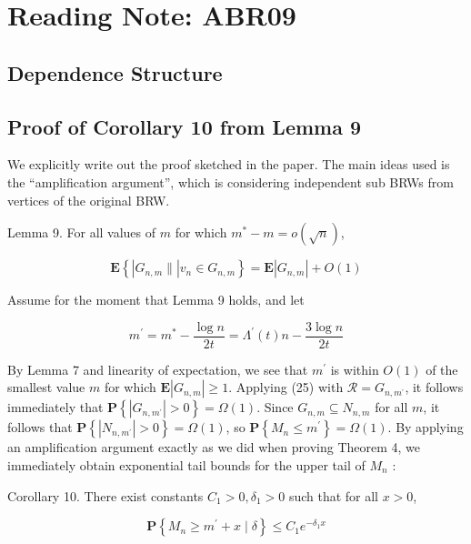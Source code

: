 \section{Reading Note: ABR09}

\subsection{Dependence Structure}

\subsection{Proof of Corollary 10 from Lemma 9}
We explicitly write out the proof sketched in the paper. The main ideas used is the ``amplification argument'', which is considering independent sub BRWs from vertices of the original BRW. 

\begin{tcolorbox}[title=,colback=gray!10,colframe=black,breakable]
    Lemma 9. For all values of $m$ for which $m^*-m=o(\sqrt{n})$,

\[
\mathbf{E}\left\{\left|G_{n, m} \|\right| v_n \in G_{n, m}\right\}=\mathbf{E}\left|G_{n, m}\right|+O(1)
\]


Assume for the moment that Lemma 9 holds, and let

\[
m^{\prime}=m^*-\frac{\log n}{2 t}=\Lambda^{\prime}(t) n-\frac{3 \log n}{2 t}
\]


By Lemma 7 and linearity of expectation, we see that $m^{\prime}$ is within $O(1)$ of the smallest value $m$ for which $\mathbf{E}\left|G_{n, m}\right| \geq 1$. Applying (25) with $\mathcal{R}=G_{n, m^{\prime}}$, it follows immediately that $\mathbf{P}\left\{\left|G_{n, m^{\prime}}\right|>0\right\}=\Omega(1)$. Since $G_{n, m} \subseteq N_{n, m}$ for all $m$, it follows that $\mathbf{P}\left\{\left|N_{n, m^{\prime}}\right|>0\right\}=\Omega(1)$, so $\mathbf{P}\left\{M_n \leq m^{\prime}\right\}=\Omega(1)$. By applying an amplification argument exactly as we did when proving Theorem 4, we immediately obtain exponential tail bounds for the upper tail of $M_n$ :

Corollary 10. There exist constants $C_1>0, \delta_1>0$ such that for all $x>0$,

\[
\mathbf{P}\left\{M_n \geq m^{\prime}+x \mid \delta\right\} \leq C_1 e^{-\delta_1 x}
\]

\end{tcolorbox}

